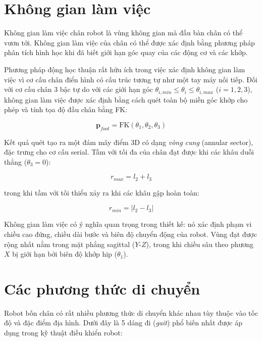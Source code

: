 \section{Không gian làm việc }
Không gian làm việc chân robot là vùng không gian mà đầu bàn chân có thể vươn tới. Không gian làm việc của chân có thể được xác định bằng phương pháp phân tích hình học khi đã biết giới hạn góc quay của các động cơ và các khớp.

Phương pháp động học thuận rất hữu ích trong việc xác định không gian làm việc vì cơ cấu chân điển hình có cấu trúc tương tự như một tay máy nối tiếp. Đối với cơ cấu chân 3 bậc tự do với các giới hạn góc $\theta_{i,min} \leq \theta_i \leq \theta_{i,max}$ ($i = 1, 2, 3$), không gian làm việc được xác định bằng cách quét toàn bộ miền góc khớp cho phép và tính tọa độ đầu chân bằng FK:

\begin{equation}
    \mathbf{p}_{foot} = \text{FK}(\theta_1, \theta_2, \theta_3)
\end{equation}

Kết quả quét tạo ra một đám mây điểm 3D có dạng \textit{vòng cung} (annular sector), đặc trưng cho cơ cấu serial. Tầm với tối đa của chân đạt được khi các khâu duỗi thẳng ($\theta_3 = 0$):

\begin{equation}
    r_{max} = l_2 + l_3
\end{equation}

trong khi tầm với tối thiểu xảy ra khi các khâu gập hoàn toàn:

\begin{equation}
    r_{min} = |l_2 - l_3|
\end{equation}

Không gian làm việc có ý nghĩa quan trọng trong thiết kế: nó xác định phạm vi chiều cao đứng, chiều dài bước và biên độ chuyển động của robot. Vùng đạt được rộng nhất nằm trong mặt phẳng sagittal ($Y$-$Z$), trong khi chiều sâu theo phương $X$ bị giới hạn bởi biên độ khớp hip ($\theta_1$).



\section{Các phương thức di chuyển}
Robot bốn chân có rất nhiều phương thức di chuyển khác nhau tùy thuộc vào tốc độ và đặc điểm địa hình. Dưới đây là 5 dáng đi (\textit{gait}) phổ biến nhất được áp dụng trong kỹ thuật điều khiển robot:

